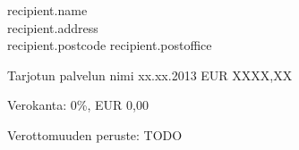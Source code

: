\documentclass[a4paper]{scrlttr2}
\begin{document}
 
\begin{letter}{{recipient.name} \\ {recipient.address} \\ {recipient.postcode} {recipient.postoffice}}

\opening{}
 

\noindent Tarjotun palvelun nimi xx.xx.2013 \hfill EUR XXXX,XX
    

\noindent Verokanta: \hfill 0\%, EUR 0,00

\noindent Verottomuuden peruste: TODO
 

\closing{}
 
\end{letter}
 
\end{document}
